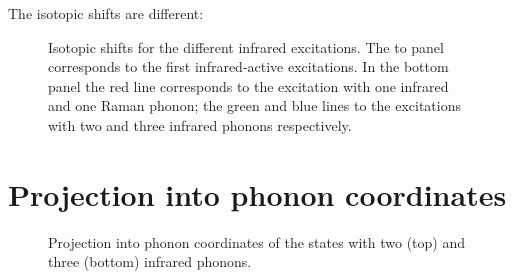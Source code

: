The isotopic shifts are different:

\begin{figure}[ht]
  \centering
  
  \caption[Isotopic shifts for the different infrared excitations.]
  {Isotopic shifts for the different infrared excitations.
  The to panel corresponds to the first infrared-active excitations.
  In the bottom panel the red line corresponds to the excitation with one infrared and one Raman phonon; the green and blue lines to the excitations with two and three infrared phonons respectively.}
  \label{fig:irIsot}
\end{figure}

\section{Projection into phonon coordinates}
\label{sec:irPhononProj}

\begin{figure}[ht]
  \centering
  
  \caption{Projection into phonon coordinates of the states with two (top) and three (bottom) infrared phonons.}
  \label{fig:phononProj2-3ir}
\end{figure}

